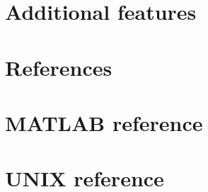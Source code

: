 \documentclass[10pt,a4paper,twoside]{book}
\begin{document}
\chapter{Additional features}
\label{chap:features}


\chapter*{References}



\appendix
%

\chapter{MATLAB reference}
\label{appendix:matlabReference}


\chapter{UNIX reference}
\label{appendix:unixReference}

\end{document}
